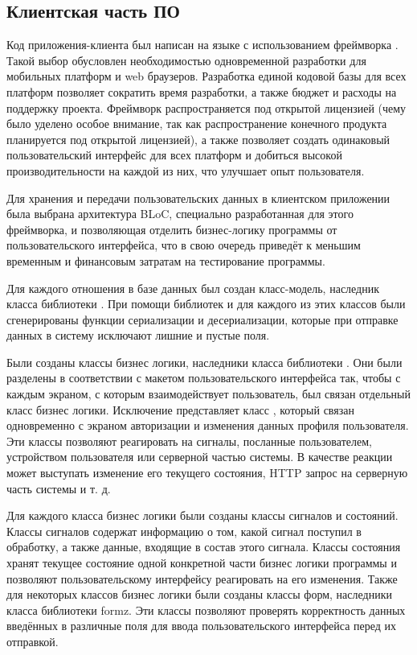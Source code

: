 \subsection{Клиентская часть ПО}

\tab
Код приложения-клиента был написан на языке  с использованием фреймворка \cite{flutter-vs-react}.
Такой выбор обусловлен необходимостью одновременной разработки для мобильных платформ и web браузеров.
Разработка единой кодовой базы для всех платформ позволяет сократить время разработки, а также бюджет и расходы на поддержку проекта.
Фреймворк  распространяется под открытой лицензией (чему было уделено особое внимание, так как распространение конечного продукта планируется под открытой лицензией), а также позволяет создать одинаковый пользовательский интерфейс для всех платформ и добиться высокой производительности на каждой из них, что улучшает опыт пользователя\cite{flutter-better}.

\tab
Для хранения и передачи пользовательских данных в клиентском приложении была выбрана архитектура BLoC\cite{bloc-better}, специально разработанная для этого фреймворка, и позволяющая отделить бизнес-логику программы от пользовательского интерфейса, что в свою очередь приведёт к меньшим временным и финансовым затратам на тестирование программы.

\tab
Для каждого отношения в базе данных был создан класс-модель, наследник класса  библиотеки .
При помощи библиотек  и  для каждого из этих классов были сгенерированы функции сериализации и десериализации, которые при отправке данных в систему исключают лишние и пустые поля.

\tab
Были созданы классы бизнес логики, наследники класса  библиотеки .
Они были разделены в соответствии с макетом пользовательского интерфейса так, чтобы с каждым экраном, с которым взаимодействует пользователь, был связан отдельный класс бизнес логики.
Исключение представляет класс , который связан одновременно с экраном авторизации и изменения данных профиля пользователя.
Эти классы позволяют реагировать на сигналы, посланные пользователем, устройством пользователя или серверной частью системы.
В качестве реакции может выступать изменение его текущего состояния, HTTP запрос на серверную часть системы и т. д.

\tab
Для каждого класса бизнес логики были созданы классы сигналов и состояний.
Классы сигналов содержат информацию о том, какой сигнал поступил в обработку, а также данные, входящие в состав этого сигнала.
Классы состояния хранят текущее состояние одной конкретной части бизнес логики программы и позволяют пользовательскому интерфейсу реагировать на его изменения.
Также для некоторых классов бизнес логики были созданы классы форм, наследники класса  библиотеки formz.
Эти классы позволяют проверять корректность данных введённых в различные поля для ввода пользовательского интерфейса перед их отправкой.

